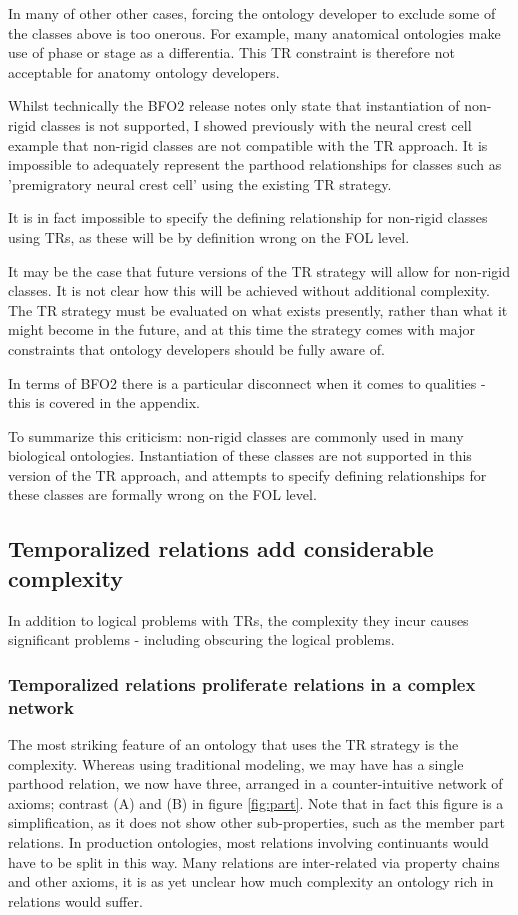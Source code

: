 \documentclass{bioinfo}
\begin{document}
In many of other other cases, forcing the ontology developer to
exclude some of the classes above is too onerous. For example, many
anatomical ontologies make use of phase or stage as a
differentia. This TR constraint is therefore not acceptable for
anatomy ontology developers.

Whilst technically the BFO2 release notes only state that
instantiation of non-rigid classes is not supported, I showed
previously with the neural crest cell example that non-rigid classes
are not compatible with the TR approach. It is impossible to
adequately represent the parthood relationships for classes such as
'premigratory neural crest cell' using the existing TR strategy.

It is in fact impossible to specify the defining relationship for
non-rigid classes using TRs, as these will be by definition wrong on
the FOL level.

It may be the case that future versions of the TR strategy will allow
for non-rigid classes. It is not clear how this will be achieved
without additional complexity.  The TR strategy must be evaluated on
what exists presently, rather than what it might become in the future,
and at this time the strategy comes with major constraints that
ontology developers should be fully aware of.

In terms of BFO2 there is a particular disconnect when it comes to
qualities - this is covered in the appendix.

To summarize this criticism: non-rigid classes are commonly used in
many biological ontologies. Instantiation of these classes are not
supported in this version of the TR approach, and attempts to specify
defining relationships for these classes are formally wrong on the FOL
level.

\subsection{Temporalized relations add considerable complexity}

In addition to logical problems with TRs, the complexity they incur
causes significant problems - including obscuring the logical
problems.

\subsubsection{Temporalized relations proliferate relations in a complex network}

The most striking feature of an ontology that uses the TR strategy is
the complexity. Whereas using traditional modeling, we may have has a
single parthood relation, we now have three, arranged in a
counter-intuitive network of axioms; contrast (A) and (B) in figure
\ref{fig:part}. Note that in fact this figure is a simplification, as
it does not show other sub-properties, such as the member part
relations. In production ontologies, most relations involving
continuants would have to be split in this way. Many relations are
inter-related via property chains and other axioms, it is as yet
unclear how much complexity an ontology rich in relations would
suffer.
\end{document}
